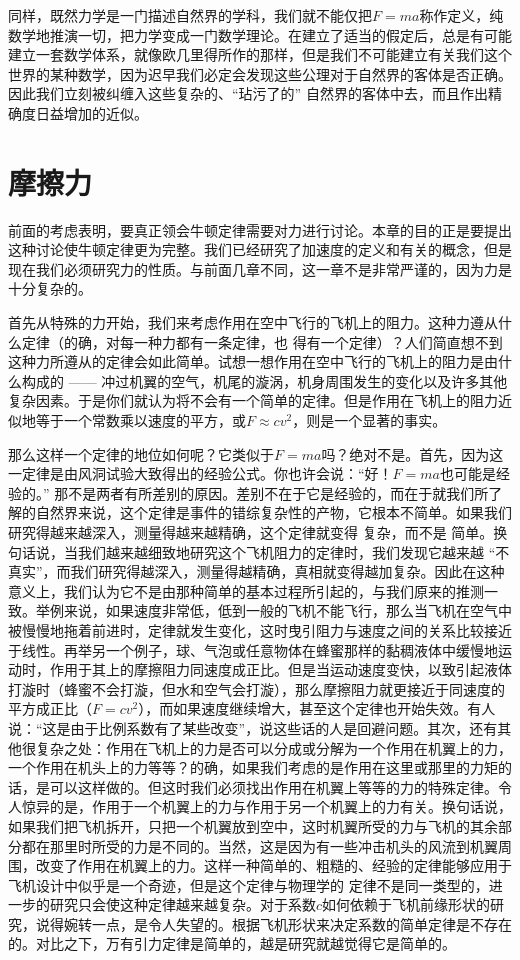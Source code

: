 \documentclass[12pt,oneside]{book}
\begin{document}
同样，既然力学是一门描述自然界的学科，我们就不能仅把$F=ma$称作定义，纯数学地推演一切，把力学变成一门数学理论。在建立了适当的假定后，总是有可能建立一套数学体系，就像欧几里得所作的那样，但是我们不可能建立有关我们这个世界的某种数学，因为迟早我们必定会发现这些公理对于自然界的客体是否正确。因此我们立刻被纠缠入这些复杂的、“玷污了的” 自然界的客体中去，而且作出精确度日益增加的近似。

\section{摩擦力}
前面的考虑表明，要真正领会牛顿定律需要对力进行讨论。本章的目的正是要提出这种讨论使牛顿定律更为完整。我们已经研究了加速度的定义和有关的概念，但是现在我们必须研究力的性质。与前面几章不同，这一章不是非常严谨的，因为力是十分复杂的。


首先从特殊的力开始，我们来考虑作用在空中飞行的飞机上的阻力。这种力遵从什么定律（的确，对每一种力都有一条定律，也  得有一个定律）？人们简直想不到这种力所遵从的定律会如此简单。试想一想作用在空中飞行的飞机上的阻力是由什么构成的 —— 冲过机翼的空气，机尾的漩涡，机身周围发生的变化以及许多其他复杂因素。于是你们就认为将不会有一个简单的定律。但是作用在飞机上的阻力近似地等于一个常数乘以速度的平方，或$F\approx cv^{2}$，则是一个显著的事实。


那么这样一个定律的地位如何呢？它类似于$F = ma$吗？绝对不是。首先，因为这一定律是由风洞试验大致得出的经验公式。你也许会说：“好！$F = ma$也可能是经验的。” 那不是两者有所差别的原因。差别不在于它是经验的，而在于就我们所了解的自然界来说，这个定律是事件的错综复杂性的产物，它根本不简单。如果我们研究得越来越深入，测量得越来越精确，这个定律就变得  复杂，而不是  简单。换句话说，当我们越来越细致地研究这个飞机阻力的定律时，我们发现它越来越 “不真实”，而我们研究得越深入，测量得越精确，真相就变得越加复杂。因此在这种意义上，我们认为它不是由那种简单的基本过程所引起的，与我们原来的推测一致。举例来说，如果速度非常低，低到一般的飞机不能飞行，那么当飞机在空气中被慢慢地拖着前进时，定律就发生变化，这时曳引阻力与速度之间的关系比较接近于线性。再举另一个例子，球、气泡或任意物体在蜂蜜那样的黏稠液体中缓慢地运动时，作用于其上的摩擦阻力同速度成正比。但是当运动速度变快，以致引起液体打漩时（蜂蜜不会打漩，但水和空气会打漩），那么摩擦阻力就更接近于同速度的平方成正比（$F = cv^{2}$），而如果速度继续增大，甚至这个定律也开始失效。有人说：“这是由于比例系数有了某些改变”，说这些话的人是回避问题。其次，还有其他很复杂之处：作用在飞机上的力是否可以分成或分解为一个作用在机翼上的力，一个作用在机头上的力等等？的确，如果我们考虑的是作用在这里或那里的力矩的话，是可以这样做的。但这时我们必须找出作用在机翼上等等的力的特殊定律。令人惊异的是，作用于一个机翼上的力与作用于另一个机翼上的力有关。换句话说，如果我们把飞机拆开，只把一个机翼放到空中，这时机翼所受的力与飞机的其余部分都在那里时所受的力是不同的。当然，这是因为有一些冲击机头的风流到机翼周围，改变了作用在机翼上的力。这样一种简单的、粗糙的、经验的定律能够应用于飞机设计中似乎是一个奇迹，但是这个定律与物理学的  定律不是同一类型的，进一步的研究只会使这种定律越来越复杂。对于系数$c$如何依赖于飞机前缘形状的研究，说得婉转一点，是令人失望的。根据飞机形状来决定系数的简单定律是不存在的。对比之下，万有引力定律是简单的，越是研究就越觉得它是简单的。
\end{document}
